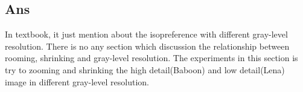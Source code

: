 \documentclass[a4paper, 11pt]{article}
\begin{document}
  \subsection*{Ans}
  In textbook, it just mention about the isopreference with different gray-level resolution. 
  There is no any section which discussion the relationship between rooming, shrinking and 
  gray-level resolution. The experiments in this section is try to zooming and shrinking 
  the high detail(Baboon) and low detail(Lena) image in different gray-level resolution. 
\end{document}
